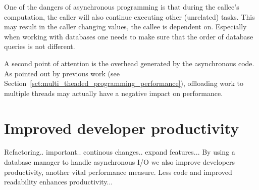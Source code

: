 One of the dangers of asynchronous programming is that during the callee's computation, the caller will also continue executing other (unrelated) tasks.
This may result in the caller changing values, the callee is dependent on.
Especially when working with databases one needs to make sure that the order of database queries is not different.

A second point of attention is the overhead generated by the asynchronous code.
As pointed out by previous work (see Section~\ref{sct:multi_theaded_programming_performance}), offloading work to multiple threads may actually have a negative impact on performance.



\section{Improved developer productivity}
Refactoring.. important.. continous changes.. expand features...
By using a database manager to handle asynchronous I/O we also improve developers productivity, another vital performance measure. Less code and improved readability enhances productivity...






